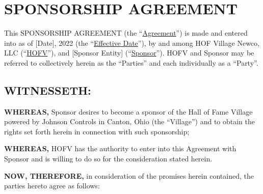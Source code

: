 \documentclass[
]{article}
\author{}
\date{}
\begin{document}
\hypertarget{sponsorship-agreement}{%
\section{SPONSORSHIP AGREEMENT}\label{sponsorship-agreement}}

This SPONSORSHIP AGREEMENT (the ``\uline{Agreement}'') is made and
entered into as of {[}Date{]}, 2022 (the ``\uline{Effective Date}''), by
and among HOF Village Newco, LLC (``\uline{HOFV}''), and {[}Sponsor
Entity{]} (``\uline{Sponsor}''). HOFV and Sponsor may be referred to
collectively herein as the ``Parties'' and each individually as a
``Party''.

\hypertarget{witnesseth}{%
\subsection{WITNESSETH:}\label{witnesseth}}

\textbf{WHEREAS,} Sponsor desires to become a sponsor of the Hall of
Fame Village powered by Johnson Controls in Canton, Ohio (the
``Village'') and to obtain the rights set forth herein in connection
with such sponsorship;

\textbf{WHEREAS,} HOFV has the authority to enter into this Agreement
with Sponsor and is willing to do so for the consideration stated
herein.

\textbf{NOW, THEREFORE,} in consideration of the promises herein
contained, the parties hereto agree as follows:
\end{document}
